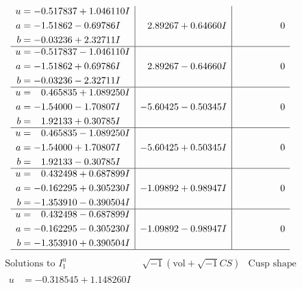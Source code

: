 \documentclass[1p]{elsarticle_modified}
\theoremstyle{definition}
\newcommand{\I}{\sqrt{-1}}
\begin{document}
$$\begin{array}{c|c|c}
\begin{aligned}
u &= -0.517837 + 1.046110 I \\
a &= -1.51862 - 0.69786 I \\
b &= -0.03236 + 2.32711 I\end{aligned}
 & \phantom{-}2.89267 + 0.64660 I & \phantom{-0.000000 } 0 \\ \hline\begin{aligned}
u &= -0.517837 - 1.046110 I \\
a &= -1.51862 + 0.69786 I \\
b &= -0.03236 - 2.32711 I\end{aligned}
 & \phantom{-}2.89267 - 0.64660 I & \phantom{-0.000000 } 0 \\ \hline\begin{aligned}
u &= \phantom{-}0.465835 + 1.089250 I \\
a &= -1.54000 - 1.70807 I \\
b &= \phantom{-}1.92133 + 0.30785 I\end{aligned}
 & -5.60425 - 0.50345 I & \phantom{-0.000000 } 0 \\ \hline\begin{aligned}
u &= \phantom{-}0.465835 - 1.089250 I \\
a &= -1.54000 + 1.70807 I \\
b &= \phantom{-}1.92133 - 0.30785 I\end{aligned}
 & -5.60425 + 0.50345 I & \phantom{-0.000000 } 0 \\ \hline\begin{aligned}
u &= \phantom{-}0.432498 + 0.687899 I \\
a &= -0.162295 + 0.305230 I \\
b &= -1.353910 - 0.390504 I\end{aligned}
 & -1.09892 + 0.98947 I & \phantom{-0.000000 } 0 \\ \hline\begin{aligned}
u &= \phantom{-}0.432498 - 0.687899 I \\
a &= -0.162295 - 0.305230 I \\
b &= -1.353910 + 0.390504 I\end{aligned}
 & -1.09892 - 0.98947 I & \phantom{-0.000000 } 0\\
 \hline 
 \end{array}$$\newpage$$\begin{array}{c|c|c}  
\text{Solutions to }I^u_{1}& \I (\text{vol} + \sqrt{-1}CS) & \text{Cusp shape}\\
 \hline 
\begin{aligned}
u &= -0.318545 + 1.148260 I \\

\end{aligned}
\end{array}$$
\end{document}
